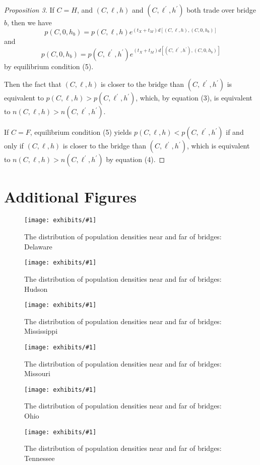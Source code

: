 \documentclass[12pt]{article}
\newcommand{\dofigure}[2]{\begin{figure}[h!]
\center %
\texttt{[image: exhibits/\#1]}
  \caption{#2\label{fig:#1}}
\end{figure}}
\begin{document}
\begin{proof}[Proposition 3]
If $C=H$, and $\left( C,\ell ,h\right) $ and $\left( C,\ell ^{\prime
},h^{\prime }\right) $ both trade over bridge $b$, then we have%
\begin{equation*}
p\left( C,0,h_{b}\right) =p\left( C,\ell ,h\right) e^{\left(
t_{X}+t_{M}\right) d\left[ \left( C,\ell ,h\right) ,\left( C,0,h_{b}\right) %
\right] }
\end{equation*}%
and%
\begin{equation*}
p\left( C,0,h_{b}\right) =p\left( C,\ell ^{\prime },h^{\prime }\right)
e^{\left( t_{X}+t_{M}\right) d\left[ \left( C,\ell ^{\prime },h^{\prime
}\right) ,\left( C,0,h_{b}\right) \right] }
\end{equation*}%
by equilibrium condition (5).

Then the fact that $\left( C,\ell ,h\right) $ is closer to the bridge than $%
\left( C,\ell ^{\prime },h^{\prime }\right) $ is equivalent to $p\left(
C,\ell ,h\right) >p\left( C,\ell ^{\prime },h^{\prime }\right) $, which, by
equation (3), is equivalent to $n\left( C,\ell ,h\right) >n\left( C,\ell
^{\prime },h^{\prime }\right) $.

If $C=F$, equilibrium condition (5) yields $p\left( C,\ell ,h\right)
<p\left( C,\ell ^{\prime },h^{\prime }\right) $ if and only if $\left(
C,\ell ,h\right) $ is closer to the bridge than $\left( C,\ell ^{\prime
},h^{\prime }\right) $, which is equivalent to $n\left( C,\ell ,h\right)
>n\left( C,\ell ^{\prime },h^{\prime }\right) $ by equation (4).
\end{proof}

\section{Additional Figures}
\setcounter{figure}{0}
\renewcommand{\thefigure}{\thesection\arabic{figure}}

\dofigure{delaware_kernel}{The distribution of population densities near and far of bridges: Delaware}
\dofigure{hudson_kernel}{The distribution of population densities near and far of bridges: Hudson}
\dofigure{mississippi_kernel}{The distribution of population densities near and far of bridges: Mississippi}
\dofigure{missouri_kernel}{The distribution of population densities near and far of bridges: Missouri}
\dofigure{ohio_kernel}{The distribution of population densities near and far of bridges: Ohio}
\dofigure{tennessee_kernel}{The distribution of population densities near and far of bridges: Tennessee}
\end{document}
